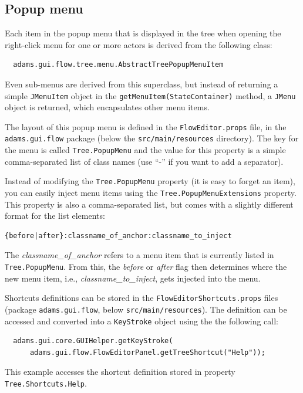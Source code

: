 \subsection{Popup menu}
\label{floweditor_popupmenu}
Each item in the popup menu that is displayed in the tree when opening the
right-click menu for one or more actors is derived from the following class:
\begin{verbatim}
  adams.gui.flow.tree.menu.AbstractTreePopupMenuItem
\end{verbatim}
Even sub-menus are derived from this superclass, but instead of returning a
simple \texttt{JMenuItem} object in the \texttt{getMenuItem(StateContainer)}
method, a \texttt{JMenu} object is returned, which encapsulates other menu
items.

The layout of this popup menu is defined in the \texttt{FlowEditor.props} file,
in the \texttt{adams.gui.flow} package (below the \texttt{src/main/resources}
directory). The key for the menu is called \texttt{Tree.PopupMenu} and the value
for this property is a simple comma-separated list of class names (use ``-''
if you want to add a separator).

Instead of modifying the \texttt{Tree.PopupMenu} property (it is easy to forget
an item), you can easily inject menu items using the \texttt{Tree.PopupMenuExtensions}
property. This property is also a comma-separated list, but comes with a slightly different
format for the list elements:
\begin{verbatim}
{before|after}:classname_of_anchor:classname_to_inject
\end{verbatim}
The \textit{classname\_of\_anchor} refers to a menu item that is currently
listed in \texttt{Tree.PopupMenu}. From this, the \textit{before} or \textit{after}
flag then determines where the new menu item, i.e., \textit{classname\_to\_inject},
gets injected into the menu.

Shortcuts definitions can be stored in the \texttt{FlowEditorShortcuts.props}
files (package \texttt{adams.gui.flow}, below \texttt{src/main/resources}). The
definition can be accessed and converted into a \texttt{KeyStroke} object using
the the following call:
\begin{verbatim}
  adams.gui.core.GUIHelper.getKeyStroke(
      adams.gui.flow.FlowEditorPanel.getTreeShortcut("Help"));
\end{verbatim}
This example accesses the shortcut definition stored in property
\texttt{Tree.Shortcuts.Help}.

